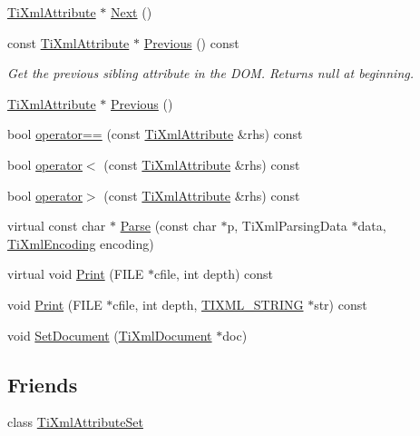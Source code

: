 \begin{DoxyCompactItemize}
\hyperlink{class_ti_xml_attribute}{Ti\+Xml\+Attribute} $\ast$ \hyperlink{class_ti_xml_attribute_a138320aa7793b148ba7e5bd0a0ea4db6}{Next} ()
\item 
const \hyperlink{class_ti_xml_attribute}{Ti\+Xml\+Attribute} $\ast$ \hyperlink{class_ti_xml_attribute_a54a5f8730c7b02b9a41b74e12e27fe86}{Previous} () const 
\begin{DoxyCompactList}\small\item\em Get the previous sibling attribute in the D\+OM. Returns null at beginning. \end{DoxyCompactList}\item 
\hyperlink{class_ti_xml_attribute}{Ti\+Xml\+Attribute} $\ast$ \hyperlink{class_ti_xml_attribute_ae4dabc932cba945ed1e92fec5f121193}{Previous} ()
\item 
bool \hyperlink{class_ti_xml_attribute_ae48c2a65b520d453914ce4e845d607cf}{operator==} (const \hyperlink{class_ti_xml_attribute}{Ti\+Xml\+Attribute} \&rhs) const 
\item 
bool \hyperlink{class_ti_xml_attribute_adb8b6f2cad5948e73e383182e7ce10de}{operator$<$} (const \hyperlink{class_ti_xml_attribute}{Ti\+Xml\+Attribute} \&rhs) const 
\item 
bool \hyperlink{class_ti_xml_attribute_a867562769ef9778c1690cd373246b05b}{operator$>$} (const \hyperlink{class_ti_xml_attribute}{Ti\+Xml\+Attribute} \&rhs) const 
\item 
virtual const char $\ast$ \hyperlink{class_ti_xml_attribute_a1437efc74bb8d49da5290772202b5e68}{Parse} (const char $\ast$p, Ti\+Xml\+Parsing\+Data $\ast$data, \hyperlink{tinyxml_8h_a88d51847a13ee0f4b4d320d03d2c4d96}{Ti\+Xml\+Encoding} encoding)
\item 
virtual void \hyperlink{class_ti_xml_attribute_acc04956c1d5c4c31fe74f7a7528d109a}{Print} (F\+I\+LE $\ast$cfile, int depth) const 
\item 
void \hyperlink{class_ti_xml_attribute_a19e6b6862a80b188571c47947e88d030}{Print} (F\+I\+LE $\ast$cfile, int depth, \hyperlink{tinyxml_8h_a92bada05fd84d9a0c9a5bbe53de26887}{T\+I\+X\+M\+L\+\_\+\+S\+T\+R\+I\+NG} $\ast$str) const 
\item 
void \hyperlink{class_ti_xml_attribute_ac12a94d4548302afb12f488ba101f7d1}{Set\+Document} (\hyperlink{class_ti_xml_document}{Ti\+Xml\+Document} $\ast$doc)
\end{DoxyCompactItemize}
\subsection*{Friends}
\begin{DoxyCompactItemize}
\item 
class \hyperlink{class_ti_xml_attribute_a35a7b7f89f708527677d5078d41ce0bf}{Ti\+Xml\+Attribute\+Set}
\end{DoxyCompactItemize}
